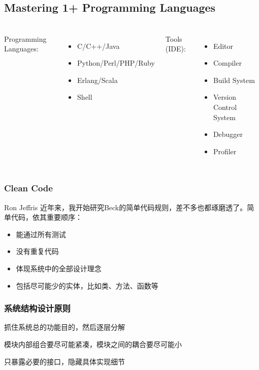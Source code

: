 \subsection{Mastering 1+ Programming Languages}
\begin{frame}
  \frametitle{\subsecname}
  \begin{columns}[t]
    Programming Languages:
    \begin{itemize}
      \item<+-> \alert{C}/C++/Java
      \item<+-> \alert{Python}/Perl/PHP/Ruby
      \item<+-> \alert{Erlang}/Scala
      \item<+-> Shell
    \end{itemize}
    Tools (IDE):
    \begin{itemize}
      \item Editor
      \item Compiler
      \item Build System
      \item Version Control System
      \item Debugger
      \item Profiler
    \end{itemize}
  \end{columns}
\end{frame}

\begin{frame}
  \frametitle{Clean Code}
  \begin{block}{Ron Jeffris}
    近年来，我开始研究Beck的简单代码规则，差不多也都琢磨透了。简单代码，依其重要顺序：
    \begin{itemize}
      \item 能通过所有测试
      \item 没有重复代码
      \item 体现系统中的全部设计理念
      \item 包括尽可能少的实体，比如类、方法、函数等
    \end{itemize}
  \end{block}
\end{frame}

\begin{frame}
  \frametitle{系统结构设计原则}
  \begin{description}
    \item [自顶向下，逐步求精] 抓住系统总的功能目的，然后逐层分解
    \item [高内聚、低耦合] 模块内部组合要尽可能紧凑，模块之间的耦合要尽可能小
    \item [信息隐藏] 只暴露必要的接口，隐藏具体实现细节
    \item [单一职责原则]
    \item [依赖倒置原则]
    \item [开放封闭原则]
  \end{description}
\end{frame}

